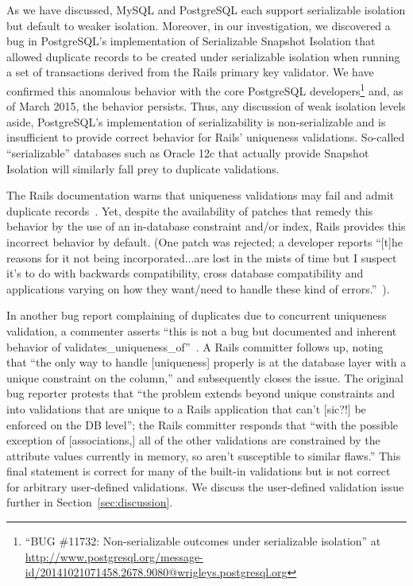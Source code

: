 As we have discussed, MySQL and PostgreSQL each support serializable
isolation but default to weaker isolation. Moreover, in our
investigation, we discovered a bug in PostgreSQL's implementation of
Serializable Snapshot Isolation that allowed duplicate records to be
created under serializable isolation when running a set of
transactions derived from the Rails primary key validator. We have
confirmed this anomalous behavior with the core PostgreSQL
developers\footnote{``BUG \#11732: Non-serializable outcomes under
  serializable isolation'' at
  \url{http://www.postgresql.org/message-id/20141021071458.2678.9080@wrigleys.postgresql.org}\label{fn:pg-bug}}
and, as of March 2015, the behavior persists. Thus, any discussion of
weak isolation levels aside, PostgreSQL's implementation of
serializability is non-serializable and is insufficient to provide
correct behavior for Rails' uniqueness validations. So-called
``serializable'' databases such as Oracle 12c that actually provide
Snapshot Isolation will similarly fall prey to duplicate validations.

The Rails documentation warns that uniqueness validations may fail and
admit duplicate records~\cite{rails-guide}. Yet, despite the
availability of patches that remedy this behavior by the use of an
in-database constraint and/or index, Rails provides this incorrect
behavior by default. (One patch was rejected; a developer reports
``[t]he reasons for it not being incorporated...are lost in the mists
of time but I suspect it's to do with backwards compatibility, cross
database compatibility and applications varying on how they want/need
to handle these kind of errors.''~\cite{code-index-patch}).

In another bug report complaining of duplicates due to concurrent
uniqueness validation, a commenter asserts ``this is not a bug but
documented and inherent behavior of
validates\_uniqueness\_of''~\cite{code-index-error}.  A Rails
committer follows up, noting that ``the only way to handle
[uniqueness] properly is at the database layer with a unique
constraint on the column,'' and subsequently closes the issue. The
original bug reporter protests that ``the problem extends beyond
unique constraints and into validations that are unique to a Rails
application that can't [sic?!]  be enforced on the DB level''; the
Rails committer responds that ``with the possible exception of
[associations,] all of the other validations are constrained by the
attribute values currently in memory, so aren't susceptible to similar
flaws.'' This final statement is correct for many of the built-in
validations but is not correct for arbitrary user-defined
validations. We discuss the user-defined validation issue further in
Section~\ref{sec:discussion}.

